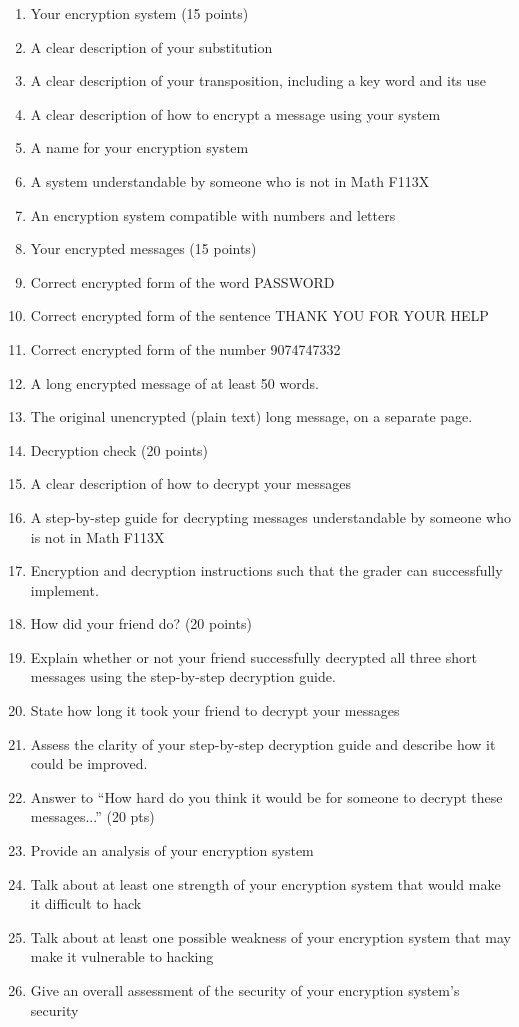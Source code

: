 \begin{enumerate}

\item Your encryption system (15 points)
\be
\item A clear description of your substitution
\item A clear description of your transposition, including a key word and its use
\item A clear description of how to encrypt a message using your system
\item A name for your encryption system
\item A system understandable by someone who is not in Math F113X
\item An encryption system compatible with numbers and letters 
\ee

\item Your encrypted messages (15 points)
\be
\item Correct encrypted form of the word PASSWORD
  \item Correct encrypted form of the sentence THANK YOU FOR YOUR HELP
  \item Correct encrypted form of the number 9074747332
  \item A long encrypted message of at least 50 words.
  \item The original unencrypted (plain text) long message, on a separate page. 
\ee

\item Decryption check (20 points)

\be
\item A clear description of how to decrypt your messages
\item A step-by-step guide for decrypting messages understandable by someone who is not in Math F113X
\item Encryption and decryption instructions such that the grader can successfully implement. 
\ee

\item How did your friend do? (20 points)
\be
\item Explain whether or not your friend successfully decrypted all three short messages using the step-by-step decryption guide.
\item State how long  it took your friend to decrypt your messages 
\item Assess the clarity of your step-by-step decryption guide and describe how it could be improved.
\ee

\item Answer to ``How hard do you think it
  would be for someone to decrypt these
  messages...'' 
  (20 pts)
  \be
  \item Provide an analysis of your encryption system
  \item Talk about at least one strength of your encryption system that would make it
 difficult to hack 
 \item Talk about at least one possible weakness of your encryption system that may make
 it vulnerable to hacking
 \item Give an overall assessment of the security of your
 encryption system's security
 \ee
 

\end{enumerate}
